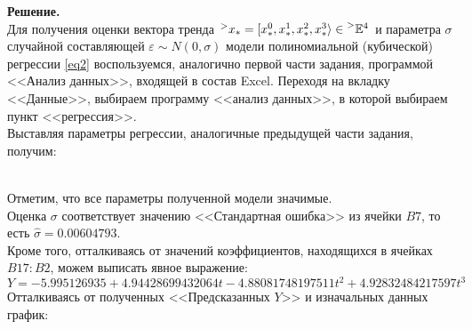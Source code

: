 \documentclass[14pt,a4paper]{scrartcl}
\begin{document}
\newpage
\textbf{Решение.}\\
Для получения оценки вектора тренда  $\prescript{>}{}{x}_* = [x_*^0, x_*^1, x_*^2, x_*^3 \rangle \in \prescript{>}{}{\mathbb{E}}^{4}$ и параметра $\sigma$ случайной составляющей $\varepsilon \sim N(0, \sigma)$ модели полиномиальной (кубической) регрессии \ref{eq2} воспользуемся, аналогично первой части задания, программой <<Анализ данных>>, входящей в состав Excel. Переходя на вкладку <<Данные>>, выбираем программу <<анализ данных>>, в которой выбираем пункт <<регрессия>>.\\
Выставляя параметры регрессии, аналогичные предыдущей части задания, получим:
\begin{figure}[h]
\end{figure}\\
Отметим, что все параметры полученной модели значимые.\\
Оценка $\sigma$ соответствует значению <<Стандартная ошибка>> из ячейки $B7$, то есть $\hat{\sigma} = 0.00604793
$.\\
Кроме того, отталкиваясь от значений коэффициентов, находящихся в ячейках $B17:B2$, можем выписать явное выражение:
\begin{equation*}
Y = -5.995126935 + 4.94428699432064 t - 4.88081748197511 t^2 + 4.92832484217597 t^3
\end{equation*}
\newpage
Отталкиваясь от полученных <<Предсказанных $Y$>> и изначальных данных график:
\begin{figure}[h]
\end{figure}\\
\end{document}
